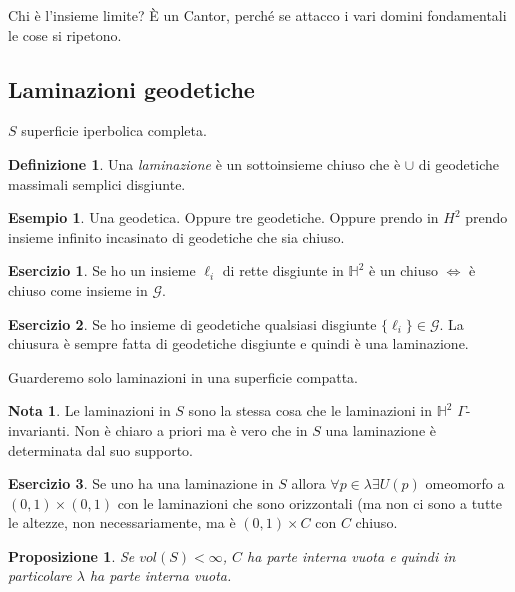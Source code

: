 \documentclass[a4paper]{article}
\newtheorem{proposition}{Proposizione}
\theoremstyle{definition}
\newtheorem{definition}{Definizione}
\newtheorem{exercise}{Esercizio}
\newtheorem{example}{Esempio}
\newtheorem{remark}{Nota}
\begin{document}
    Chi è l'insieme limite? È un Cantor, perché se attacco i vari domini fondamentali le cose si ripetono.

\subsection{Laminazioni geodetiche}
    $S$ superficie iperbolica completa.
    \begin{definition}
        Una \emph{laminazione} è un sottoinsieme chiuso che è $\cup$ di geodetiche massimali semplici disgiunte.
    \end{definition}

    \begin{example}
        Una geodetica. Oppure tre geodetiche. Oppure prendo in $H^2$ prendo insieme infinito incasinato di geodetiche che sia chiuso.
    \end{example}

    \begin{exercise}
        Se ho un insieme $\ell_i$ di rette disgiunte in $\mathbb H^2$ è un chiuso $\iff$ è chiuso come insieme in $\mathcal G$.
    \end{exercise}

    \begin{exercise}
        Se ho insieme di geodetiche qualsiasi disgiunte $\{\ell_i\} \in \mathcal G$. La chiusura è sempre fatta di geodetiche disgiunte e quindi è una laminazione.
    \end{exercise}

    Guarderemo solo laminazioni in una superficie compatta.

    \begin{remark}
        Le laminazioni in $S$ sono la stessa cosa che le laminazioni in $\mathbb H^2$ $\Gamma$-invarianti. Non è chiaro a priori ma è vero che in $S$ una laminazione è determinata dal suo supporto.
    \end{remark}

    \begin{exercise}
        Se uno ha una laminazione in $S$ allora $\forall p \in \lambda \exists U(p)$ omeomorfo a $(0,1) \times (0,1)$ con le laminazioni che sono orizzontali (ma non ci sono a tutte le altezze, non necessariamente, ma è $(0,1) \times C$ con $C$ chiuso.
    \end{exercise}

    \begin{proposition}
        Se $vol(S) < \infty$, $C$ ha parte interna vuota e quindi in particolare $\lambda$ ha parte interna vuota.
    \end{proposition}
\end{document}
